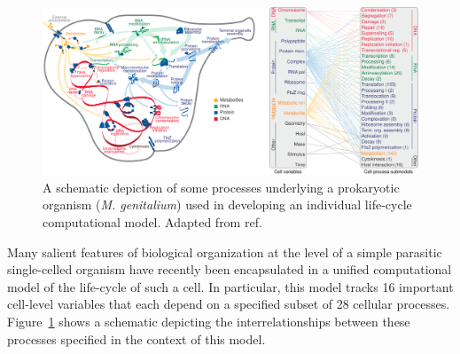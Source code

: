\begin{figure}
\begin{center}
\noindent\includegraphics[width=0.95\columnwidth]{fig/cellprocessesdiagram.pdf}
\end{center}
\caption{A schematic depiction of some processes underlying a prokaryotic organism (\emph{M. genitalium}) used in developing an individual life-cycle computational model. Adapted from ref.}
\label{fig:cellprocess}
\end{figure}
Many salient features of biological organization at the level of a simple parasitic single-celled organism have recently been encapsulated in a unified computational model of the life-cycle of such a cell. In particular, this model tracks 16 important cell-level variables that each depend on a specified subset of 28 cellular processes. Figure~\ref{fig:cellprocess} shows a schematic depicting the interrelationships between these processes specified in the context of this model.

